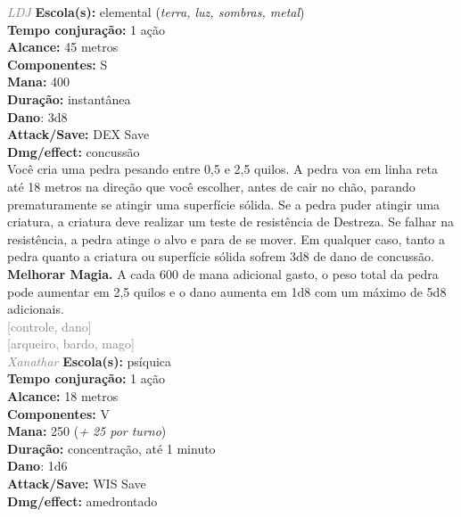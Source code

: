 \documentclass{RPG_Adventure}[2021/10/20]
\begin{document}
{\tiny \textcolor{gray}{\textit{LDJ}}}
{\small \t \textbf{Escola(s):} elemental (\textit{terra, luz, sombras, metal})\\\t \textbf{Tempo conjuração:} 1 ação\\\t \textbf{Alcance:} 45 metros\\\t \textbf{Componentes:} S\\\t \textbf{Mana:} 400\\\t \textbf{Duração:} instantânea\\\t \textbf{Dano}: 3d8\\\t \textbf{Attack/Save:} DEX Save\\\t \textbf{Dmg/effect:} concussão\\}
{\normalsize Você cria uma pedra pesando entre 0,5 e 2,5 quilos. A pedra voa em linha reta até 18 metros na direção que você escolher, antes de cair no chão, parando prematuramente se atingir uma superfície sólida. Se a pedra puder atingir uma criatura, a criatura deve realizar um teste de resistência de Destreza. Se falhar na resistência, a pedra atinge o alvo e para de se mover. Em qualquer caso, tanto a pedra quanto a criatura ou superfície sólida sofrem 3d8 de dano de concussão.\\\t \textbf{Melhorar Magia.} A cada 600 de mana adicional gasto, o peso total da pedra pode aumentar em 2,5 quilos e o dano aumenta em 1d8 com um máximo de 5d8 adicionais.\\}
{\scriptsize \textcolor{gray}{[controle, dano]\\}}
{\scriptsize \textcolor{gray}{[arqueiro, bardo, mago]\\}}
{\tiny \textcolor{gray}{\textit{Xanathar}}}
{\small \t \textbf{Escola(s):} psíquica\\\t \textbf{Tempo conjuração:} 1 ação\\\t \textbf{Alcance:} 18 metros\\\t \textbf{Componentes:} V\\\t \textbf{Mana:} 250 (\textit{+ 25 por turno})\\\t \textbf{Duração:} concentração, até 1 minuto\\\t \textbf{Dano}: 1d6\\\t \textbf{Attack/Save:} WIS Save\\\t \textbf{Dmg/effect:} amedrontado\\}
\end{document}
